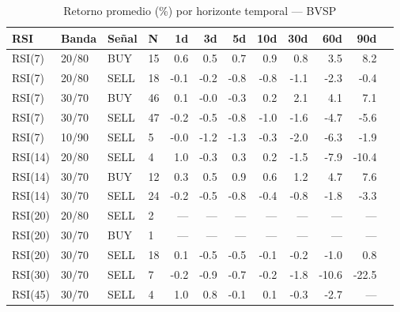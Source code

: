 %
\begin{table}[htbp]
    \centering
    \caption{Retorno promedio (\%) por horizonte temporal --- BVSP}
    \label{tab:media_bvsp}
    \small
    \begin{tabular}{llllrrrrrrrr}
        \toprule
        \textbf{RSI} & \textbf{Banda} & \textbf{Se\~{n}al} & \textbf{N} & \textbf{1d} & \textbf{3d} & \textbf{5d} & \textbf{10d} & \textbf{30d} & \textbf{60d} & \textbf{90d} \\
        \midrule
        RSI(7) & 20/80 & BUY & 15 & 0.6 & 0.5 & 0.7 & 0.9 & 0.8 & 3.5 & 8.2 \\
        RSI(7) & 20/80 & SELL & 18 & -0.1 & -0.2 & -0.8 & -0.8 & -1.1 & -2.3 & -0.4 \\
        RSI(7) & 30/70 & BUY & 46 & 0.1 & -0.0 & -0.3 & 0.2 & 2.1 & 4.1 & 7.1 \\
        RSI(7) & 30/70 & SELL & 47 & -0.2 & -0.5 & -0.8 & -1.0 & -1.6 & -4.7 & -5.6 \\
        RSI(7) & 10/90 & SELL & 5 & -0.0 & -1.2 & -1.3 & -0.3 & -2.0 & -6.3 & -1.9 \\
        \midrule
        RSI(14) & 20/80 & SELL & 4 & 1.0 & -0.3 & 0.3 & 0.2 & -1.5 & -7.9 & -10.4 \\
        RSI(14) & 30/70 & BUY & 12 & 0.3 & 0.5 & 0.9 & 0.6 & 1.2 & 4.7 & 7.6 \\
        RSI(14) & 30/70 & SELL & 24 & -0.2 & -0.5 & -0.8 & -0.4 & -0.8 & -1.8 & -3.3 \\
        \midrule
        RSI(20) & 20/80 & SELL & 2 & --- & --- & --- & --- & --- & --- & --- \\
        RSI(20) & 30/70 & BUY & 1 & --- & --- & --- & --- & --- & --- & --- \\
        RSI(20) & 30/70 & SELL & 18 & 0.1 & -0.5 & -0.5 & -0.1 & -0.2 & -1.0 & 0.8 \\
        \midrule
        RSI(30) & 30/70 & SELL & 7 & -0.2 & -0.9 & -0.7 & -0.2 & -1.8 & -10.6 & -22.5 \\
        \midrule
        RSI(45) & 30/70 & SELL & 4 & 1.0 & 0.8 & -0.1 & 0.1 & -0.3 & -2.7 & --- \\
        \bottomrule
    \end{tabular}
\end{table}
